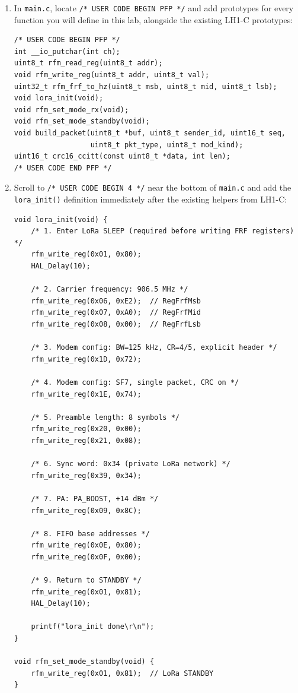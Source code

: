 \documentclass[11pt,letterpaper]{article}
\begin{document}
\newpage
\begin{enumerate}[leftmargin=2em]
	\item In \texttt{main.c}, locate \texttt{/* USER CODE BEGIN PFP */} and add prototypes for every function you will define in this lab, alongside the existing LH1-C prototypes:
\begin{verbatim}
/* USER CODE BEGIN PFP */
int __io_putchar(int ch);
uint8_t rfm_read_reg(uint8_t addr);
void rfm_write_reg(uint8_t addr, uint8_t val);
uint32_t rfm_frf_to_hz(uint8_t msb, uint8_t mid, uint8_t lsb);
void lora_init(void);
void rfm_set_mode_rx(void);
void rfm_set_mode_standby(void);
void build_packet(uint8_t *buf, uint8_t sender_id, uint16_t seq,
                  uint8_t pkt_type, uint8_t mod_kind);
uint16_t crc16_ccitt(const uint8_t *data, int len);
/* USER CODE END PFP */
\end{verbatim}

	\item Scroll to \texttt{/* USER CODE BEGIN 4 */} near the bottom of \texttt{main.c} and add the \texttt{lora\_init()} definition immediately after the existing helpers from LH1-C:
\begin{verbatim}
void lora_init(void) {
    /* 1. Enter LoRa SLEEP (required before writing FRF registers) */
    rfm_write_reg(0x01, 0x80);
    HAL_Delay(10);

    /* 2. Carrier frequency: 906.5 MHz */
    rfm_write_reg(0x06, 0xE2);  // RegFrfMsb
    rfm_write_reg(0x07, 0xA0);  // RegFrfMid
    rfm_write_reg(0x08, 0x00);  // RegFrfLsb

    /* 3. Modem config: BW=125 kHz, CR=4/5, explicit header */
    rfm_write_reg(0x1D, 0x72);

    /* 4. Modem config: SF7, single packet, CRC on */
    rfm_write_reg(0x1E, 0x74);

    /* 5. Preamble length: 8 symbols */
    rfm_write_reg(0x20, 0x00);
    rfm_write_reg(0x21, 0x08);

    /* 6. Sync word: 0x34 (private LoRa network) */
    rfm_write_reg(0x39, 0x34);

    /* 7. PA: PA_BOOST, +14 dBm */
    rfm_write_reg(0x09, 0x8C);

    /* 8. FIFO base addresses */
    rfm_write_reg(0x0E, 0x80);
    rfm_write_reg(0x0F, 0x00);

    /* 9. Return to STANDBY */
    rfm_write_reg(0x01, 0x81);
    HAL_Delay(10);

    printf("lora_init done\r\n");
}

void rfm_set_mode_standby(void) {
    rfm_write_reg(0x01, 0x81);  // LoRa STANDBY
}


\end{verbatim}
\end{enumerate}
\end{document}
